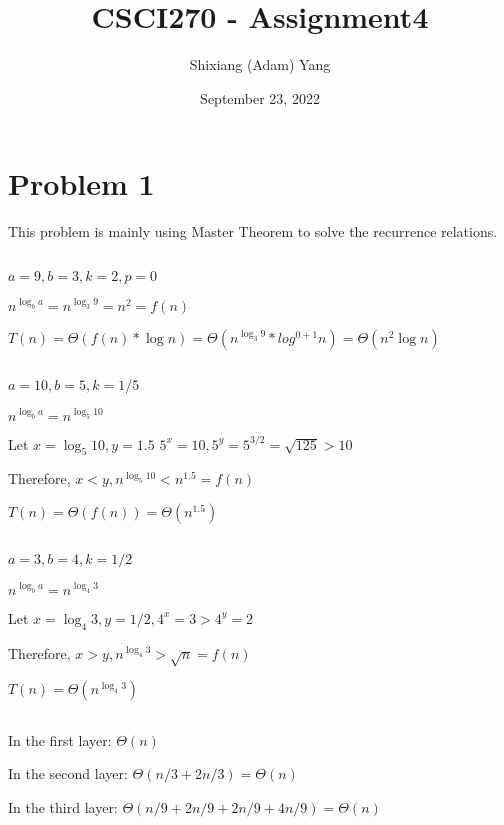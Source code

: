 \documentclass{article}
\author{Shixiang (Adam) Yang}
\date{September 23, 2022}
\title{CSCI270 - Assignment4}
\begin{document}
 \maketitle
\section{Problem 1}
This problem is mainly using Master Theorem to solve the recurrence relations.
\subsection{}
$a = 9, b = 3, k = 2, p = 0$

$n^{\log_b{a}} = n^{\log_3{9}} = n^2 = f(n)$

$T(n) = \Theta(f(n)*\log{n}) = \Theta(n^{\log_3{9}}*log^{0+1}{n}) = \Theta(n^2\log{n})$

\subsection{}

$a=10, b=5, k = 1/5$

$n^{\log_b{a}}=n^{\log_5{10}}$

Let $x = \log_5{10}, y = 1.5$
$5^x = 10, 5^y = 5^{3/2} = \sqrt{125} > 10$

Therefore, $x < y, n^{\log_5{10}} < n^{1.5} = f(n)$

$T(n) = \Theta(f(n)) = \Theta(n^{1.5})$

\subsection{}

$a=3,b=4,k=1/2$

$n^{\log_b{a}} = n^{\log_4{3}}$

Let $x=\log_4{3}, y = 1/2, 4^x = 3 > 4^y = 2$

Therefore, $x>y, n^{\log_4{3}} > \sqrt{n} = f(n)$

$T(n)=\Theta(n^{\log_4{3}})$

\subsection{}

In the first layer: $\Theta(n)$

In the second layer: $\Theta(n/3+2n/3)=\Theta(n)$

In the third layer:
$\Theta(n/9+2n/9+2n/9+4n/9)=\Theta(n)$
\end{document}
